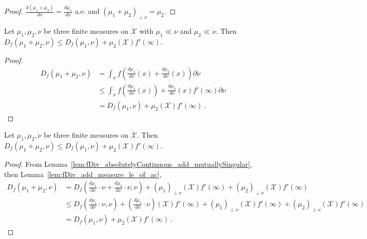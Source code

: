 \begin{proof}\leanok
$\frac{d(\mu_1 + \mu_2)}{d \nu} = \frac{d \mu_1}{d \nu}$ a.e. and $(\mu_1 + \mu_2)_{\perp \nu} = \mu_2$.
\end{proof}


\begin{lemma}
  \label{lem:fDiv_add_measure_le_of_ac}
  \leanok
  Let $\mu_1, \mu_2, \nu$ be three finite measures on $\mathcal X$ with $\mu_1 \ll \nu$ and $\mu_2 \ll \nu$. Then
  $D_f(\mu_1 + \mu_2, \nu) \le D_f(\mu_1, \nu) + \mu_2(\mathcal X) f'(\infty)$.
\end{lemma}

\begin{proof}\leanok
\begin{align*}
D_f(\mu_1 + \mu_2, \nu)
&= \int_x f \left( \frac{d \mu_1}{d\nu}(x) + \frac{d\mu_2}{d\nu}(x) \right) \partial \nu
\\
&\le \int_x f \left( \frac{d \mu_1}{d\nu}(x) \right) + \frac{d\mu_2}{d\nu}(x) f'(\infty) \partial \nu
\\
&= D_f(\mu_1, \nu) + \mu_2(\mathcal X) f'(\infty)
\: .
\end{align*}
\end{proof}


\begin{lemma}
  \label{lem:fDiv_add_measure_le}
  \leanok
  Let $\mu_1, \mu_2, \nu$ be three finite measures on $\mathcal X$. Then
  $D_f(\mu_1 + \mu_2, \nu) \le D_f(\mu_1, \nu) + \mu_2(\mathcal X) f'(\infty)$.
\end{lemma}

\begin{proof}\leanok
{}
From Lemma~\ref{lem:fDiv_absolutelyContinuous_add_mutuallySingular}, then Lemma~\ref{lem:fDiv_add_measure_le_of_ac},
\begin{align*}
D_f(\mu_1 + \mu_2, \nu)
&= D_f(\frac{d\mu_1}{d \nu}\cdot \nu + \frac{d\mu_2}{d \nu}\cdot \nu, \nu) + (\mu_1)_{\perp\nu}(\mathcal X) f'(\infty) + (\mu_2)_{\perp\nu}(\mathcal X) f'(\infty)
\\
&\le D_f(\frac{d\mu_1}{d \nu}\cdot \nu, \nu) + (\frac{d\mu_2}{d \nu}\cdot \nu)(\mathcal X) f'(\infty) + (\mu_1)_{\perp\nu}(\mathcal X) f'(\infty) + (\mu_2)_{\perp\nu}(\mathcal X) f'(\infty)
\\
&= D_f(\mu_1, \nu) + \mu_2(\mathcal X) f'(\infty)
\: .
\end{align*}
\end{proof}


